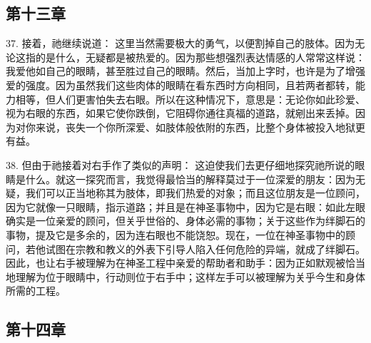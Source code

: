 
\subsection{第十三章}

37. 接着，祂继续说道： 这里当然需要极大的勇气，以便割掉自己的肢体。因为无论这指的是什么，无疑都是被热爱的。因为那些想强烈表达情感的人常常这样说：我爱他如自己的眼睛，甚至胜过自己的眼睛。然后，当加上字时，也许是为了增强爱的强度。因为虽然我们这些肉体的眼睛在看东西时方向相同，且若两者都转，能力相等，但人们更害怕失去右眼。所以在这种情况下，意思是：无论你如此珍爱、视为右眼的东西，如果它使你跌倒，它阻碍你通往真福的道路，就剜出来丢掉。因为对你来说，丧失一个你所深爱、如肢体般依附的东西，比整个身体被投入地狱更有益。\par

38. 但由于祂接着对右手作了类似的声明： 这迫使我们去更仔细地探究祂所说的眼睛是什么。就这一探究而言，我觉得最恰当的解释莫过于一位深爱的朋友：因为无疑，我们可以正当地称其为肢体，即我们热爱的对象；而且这位朋友是一位顾问，因为它就像一只眼睛，指示道路；并且是在神圣事物中，因为它是右眼：如此左眼确实是一位亲爱的顾问，但关乎世俗的、身体必需的事物；关于这些作为绊脚石的事物，提及它是多余的，因为连右眼也不能饶恕。现在，一位在神圣事物中的顾问，若他试图在宗教和教义的外表下引导人陷入任何危险的异端，就成了绊脚石。因此，也让右手被理解为在神圣工程中亲爱的帮助者和助手：因为正如默观被恰当地理解为位于眼睛中，行动则位于右手中；这样左手可以被理解为关乎今生和身体所需的工程。\par


\subsection{第十四章}

